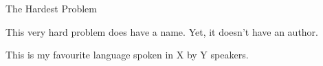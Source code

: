 \documentclass[a4paper, 12pt]{article}
\begin{document}
\begin{lingproblem}{The Hardest Problem}

This very hard problem does have a name. Yet, it doesn't have an author.

\begin{tasks}
\end{tasks}

\begin{langinfo*}
This is my favourite language spoken in X by Y speakers.
\end{langinfo*}

\end{lingproblem}
\end{document}
